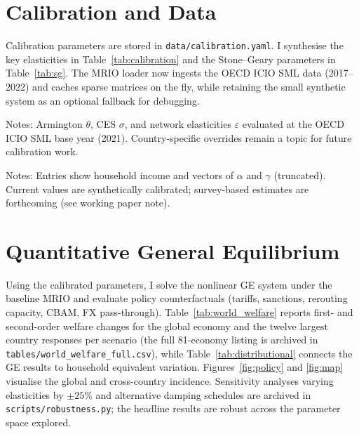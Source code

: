 \documentclass[12pt]{article}
\begin{document}
\section{Calibration and Data}
Calibration parameters are stored in \texttt{data/calibration.yaml}. I synthesise the key elasticities in Table~\ref{tab:calibration} and the Stone--Geary parameters in Table~\ref{tab:sg}. The MRIO loader now ingests the OECD ICIO SML data (2017--2022) and caches sparse matrices on the fly, while retaining the small synthetic system as an optional fallback for debugging.

\begin{table}[t]
    \centering
    \caption{Sectoral elasticities in baseline calibration}
    \label{tab:calibration}
    {\begingroup
    \setlength{\tabcolsep}{5pt}
    \renewcommand{\arraystretch}{0.85}
    \scriptsize
    
    \endgroup}
    \vspace{0.5ex}
    \begin{minipage}{0.92\linewidth}
        \footnotesize
        Notes: Armington $\theta$, CES $\sigma$, and network elasticities $\varepsilon$ evaluated at the OECD ICIO SML base year (2021). Country-specific overrides remain a topic for future calibration work.
    \end{minipage}
\end{table}

\begin{table}[t]
    \centering
    \caption{Stone--Geary income groups}
    \label{tab:sg}
    {\begingroup
    \setlength{\tabcolsep}{5pt}
    \renewcommand{\arraystretch}{0.88}
    \scriptsize
    
    \endgroup}
    \vspace{0.5ex}
    \begin{minipage}{0.92\linewidth}
        \footnotesize
        Notes: Entries show household income and vectors of $\alpha$ and $\gamma$ (truncated). Current values are synthetically calibrated; survey-based estimates are forthcoming (see working paper note).
    \end{minipage}
\end{table}

\section{Quantitative General Equilibrium}\label{sec:quantGE}
Using the calibrated parameters, I solve the nonlinear GE system under the baseline MRIO and evaluate policy counterfactuals (tariffs, sanctions, rerouting capacity, CBAM, FX pass-through). Table~\ref{tab:world_welfare} reports first- and second-order welfare changes for the global economy and the twelve largest country responses per scenario (the full 81-economy listing is archived in \texttt{tables/world\_welfare\_full.csv}), while Table~\ref{tab:distributional} connects the GE results to household equivalent variation. Figures~\ref{fig:policy} and \ref{fig:map} visualise the global and cross-country incidence. Sensitivity analyses varying elasticities by $\pm25\%$ and alternative damping schedules are archived in \texttt{scripts/robustness.py}; the headline results are robust across the parameter space explored.
\end{document}

